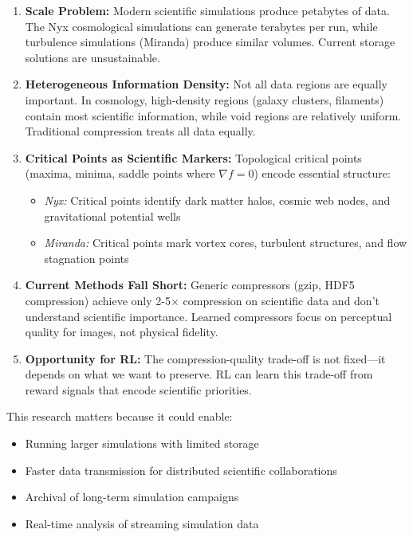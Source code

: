 \documentclass[11pt]{article}
\begin{document}
\begin{enumerate}
    \item \textbf{Scale Problem:} Modern scientific simulations produce petabytes of data. The Nyx cosmological simulations can generate terabytes per run, while turbulence simulations (Miranda) produce similar volumes. Current storage solutions are unsustainable.

    \item \textbf{Heterogeneous Information Density:} Not all data regions are equally important. In cosmology, high-density regions (galaxy clusters, filaments) contain most scientific information, while void regions are relatively uniform. Traditional compression treats all data equally.

    \item \textbf{Critical Points as Scientific Markers:} Topological critical points (maxima, minima, saddle points where $\nabla f = 0$) encode essential structure:
    \begin{itemize}
        \item \textit{Nyx:} Critical points identify dark matter halos, cosmic web nodes, and gravitational potential wells
        \item \textit{Miranda:} Critical points mark vortex cores, turbulent structures, and flow stagnation points
    \end{itemize}

    \item \textbf{Current Methods Fall Short:} Generic compressors (gzip, HDF5 compression) achieve only 2-5$\times$ compression on scientific data and don't understand scientific importance. Learned compressors focus on perceptual quality for images, not physical fidelity.

    \item \textbf{Opportunity for RL:} The compression-quality trade-off is not fixed—it depends on what we want to preserve. RL can learn this trade-off from reward signals that encode scientific priorities.
\end{enumerate}

This research matters because it could enable:
\begin{itemize}
    \item Running larger simulations with limited storage
    \item Faster data transmission for distributed scientific collaborations
    \item Archival of long-term simulation campaigns
    \item Real-time analysis of streaming simulation data
\end{itemize}
\end{document}
